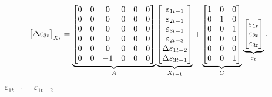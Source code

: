 \documentclass[a4paper,12pt]{article}
\begin{document}
\begin{align}
{\begin{bmatrix}
\Delta \varepsilon _{3t}%
\end{bmatrix}%
}_{X_{t}}& =\underbrace{%
\begin{bmatrix}
0 & 0 & 0 & 0 & 0 & 0 \\ 
0 & 0 & 0 & 0 & 0 & 0 \\ 
0 & 0 & 0 & 0 & 0 & 0 \\ 
0 & 0 & 0 & 0 & 0 & 0 \\ 
0 & 0 & 0 & 0 & 0 & 0 \\ 
0 & 0 & -1 & 0 & 0 & 0%
\end{bmatrix}%
}_{A}\underbrace{%
\begin{bmatrix}
\varepsilon _{1t-1} \\ 
\varepsilon _{2t-1} \\ 
\varepsilon _{3t-1} \\ 
\varepsilon _{2t-3} \\ 
\Delta \varepsilon _{1t-2} \\ 
\Delta \varepsilon _{3t-1}%
\end{bmatrix}%
}_{X_{t-1}}+\underbrace{%
\begin{bmatrix}
1 & 0 & 0 \\ 
0 & 1 & 0 \\ 
0 & 0 & 1 \\ 
0 & 0 & 0 \\ 
0 & 0 & 0 \\ 
0 & 0 & 1%
\end{bmatrix}%
}_{C}\underbrace{%
\begin{bmatrix}
\varepsilon _{1t} \\ 
\varepsilon _{2t} \\ 
\varepsilon _{3t}%
\end{bmatrix}%
}_{\varepsilon _{t}}.
\end{align}%
\bigskip 

\bigskip $\varepsilon _{1t-1}-\varepsilon _{1t-2}$
\end{document}
